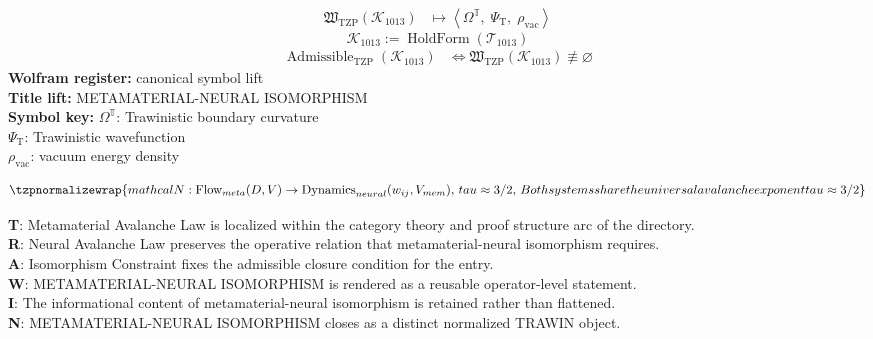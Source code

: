 \noindent
\begin{minipage}[t]{0.48\linewidth}
\begingroup
\small
\[
\begin{aligned}
\mathfrak{W}_{\mathrm{TZP}}\!\left(\mathcal{K}_{1013}\right)
&\longmapsto
\left\langle \Omega^{\mathbb{T}},\; \Psi_{\mathrm{T}},\; \rho_{\mathrm{vac}} \right\rangle
\end{aligned}
\]
\[
\mathcal{K}_{1013}
:=
\operatorname{HoldForm}\!\left(\mathcal{T}_{1013}\right)
\]
\[
\begin{aligned}
\operatorname{Admissible}_{\mathrm{TZP}}\!\left(\mathcal{K}_{1013}\right)
&\Longleftrightarrow
\mathfrak{W}_{\mathrm{TZP}}\!\left(\mathcal{K}_{1013}\right)\not\equiv\varnothing
\end{aligned}
\]
\textbf{Wolfram register:} canonical symbol lift\\
\textbf{Title lift:} METAMATERIAL-NEURAL ISOMORPHISM\\
\textbf{Symbol key:} \(\Omega^{\mathbb{T}}\): Trawinistic boundary curvature\\ \(\Psi_{\mathrm{T}}\): Trawinistic wavefunction\\ \(\rho_{\mathrm{vac}}\): vacuum energy density
\par
\endgroup
\end{minipage}\hfill
\begin{minipage}[t]{0.48\linewidth}
\[
\tzpnormalizewrap{mathcal{N}: \text{Flow}_{meta}(D, V) \to \text{Dynamics}_{neural}(w_{ij}, V_{mem}),\,tau \approx 3/2,\,Both systems share the universal avalanche exponent tau \approx 3/2}
\]

\small
\textbf{T}: Metamaterial Avalanche Law is localized within the category theory and proof structure arc of the directory.\\
\textbf{R}: Neural Avalanche Law preserves the operative relation that metamaterial-neural isomorphism requires.\\
\textbf{A}: Isomorphism Constraint fixes the admissible closure condition for the entry.\\
\textbf{W}: METAMATERIAL-NEURAL ISOMORPHISM is rendered as a reusable operator-level statement.\\
\textbf{I}: The informational content of metamaterial-neural isomorphism is retained rather than flattened.\\
\textbf{N}: METAMATERIAL-NEURAL ISOMORPHISM closes as a distinct normalized TRAWIN object.
\normalsize
\end{minipage}

